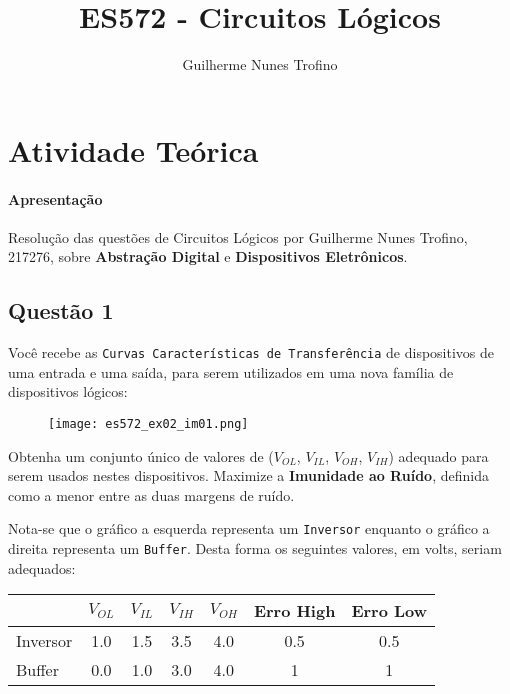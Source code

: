 \documentclass{article}
\title{ES572 - Circuitos Lógicos}
\author{Guilherme Nunes Trofino}
\begin{document}
    \maketitle
\newpage

    \section{Atividade Teórica}
        \paragraph{Apresentação}Resolução das questões de Circuitos Lógicos por Guilherme Nunes Trofino, 217276, sobre \textbf{Abstração Digital} e \textbf{Dispositivos Eletrônicos}.

        \subsection{Questão 1}
            \begin{exercise}
                Você recebe as \texttt{Curvas Características de Transferência} de dispositivos de uma entrada e uma saída, para serem utilizados em uma nova família de dispositivos lógicos:
                    \begin{figure}[H]
                        \centering
                        \texttt{[image: es572\_ex02\_im01.png]}
                    \end{figure} \noindent
                Obtenha um conjunto único de valores de ($V_{OL}$, $V_{IL}$, $V_{OH}$, $V_{IH}$) adequado para serem usados nestes dispositivos. Maximize a \textbf{Imunidade ao Ruído}, definida como a menor entre as duas margens de ruído.
            \end{exercise}
            \begin{resolution}
                Nota-se que o gráfico a esquerda representa um \texttt{Inversor} enquanto o gráfico a direita representa um \texttt{Buffer}. Desta forma os seguintes valores, em volts, seriam adequados:
                    \begin{table}[H]
                        \centering  
                        \begin{tabular}[]{l|cccc|cc}\hline
                                     & $V_{OL}$ & $V_{IL}$ & $V_{IH}$ & $V_{OH}$ & Erro High & Erro Low\\\hline
                            Inversor & 1.0      & 1.5      & 3.5      & 4.0      & 0.5       & 0.5\\
                            Buffer   & 0.0      & 1.0      & 3.0      & 4.0      & 1         & 1\\\hline
                        \end{tabular}
                    \end{table}
            \end{resolution}
\end{document}
